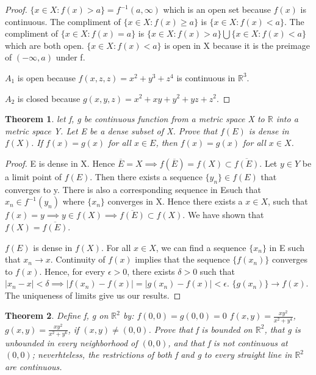 \documentclass{article}
\theoremstyle{plain}
\newtheorem{theorem}{Theorem}
\theoremstyle{definition}
\begin{document}
 \begin{proof}
	 $\{ x \in X: f(x) > a \} = f^{-1}(a,\infty)$ which is an open set because $f(x)$ is continuous. The compliment of $\{ x \in X: f(x) \geq a \}$ is $\{ x \in X: f(x) <  a \}$. The compliment of $\{x \in X: f(x) = a\}$ is $\{ x \in X: f(x) > a \} \bigcup \{x \in X: f(x) < a \}$ which are both open. $\{ x \in X: f(x) < a \}$ is open in X because it is the preimage of $(-\infty, a)$ under f. 
	 

	 $A_{1}$ is open because $f(x,z,z) = x^{2} + y^{3} + z^{4}$ is continuous in $\mathbb{R}^{3}$. 

	 $A_{2}$ is closed because $g(x,y,z) = x^{2} + xy + y^{2} + yz + z^{2}$.
 \end{proof}

 \begin{theorem}
	  
	 let f, g  be continuous function from a metric space X to $\mathbb{R}$ into a metric space Y. Let E be a dense subset of X. Prove that $f(E)$ is dense in $f(X)$. If $f(x) = g(x)$ for all $x \in E$, then $f(x) = g(x)$ for all $x \in X$.
 \end{theorem}

 \begin{proof}
	 E is dense in X. Hence $\overline{E} = X \implies f(\overline{E}) = f(X) \subset \overline{f(E)}$. Let $y \in Y$ be a limit point of $f(E)$. Then there exists a sequence $\{y_{n}\} \in f(E)$ that converges to y. There is also a corresponding sequence in Esuch that $x_{n} \in  f^{-1}(y_{n})$ where $\{x_{n}\}$ converges in X. Hence there exists a $x \in X$, such that $f(x) = y \implies y \in f(X) \implies \overline{f(E)} \subset f(X)$. We have shown that $f(X) = \overline{f(E)}$. 

	 $f(E)$ is dense in $f(X)$. For all $x \in X$, we can find a sequence $\{x_{n}\}$ in E such that $x_{n} \to x$. Continuity of $f(x)$ implies that the sequence $\{f(x_{n})\}$ converges to $f(x)$. Hence, for every $\epsilon > 0$, there exists $\delta > 0$ such that $|x_{n} - x| < \delta \implies |f(x_{n}) - f(x)| = |g(x_{n}) - f(x)| < \epsilon$. $\{ g(x_{n})\} \to f(x)$. The uniqueness of limits give us our results.
 \end{proof}

\begin{theorem}
	Define f, g on $\mathbb{R}^{2}$ by: $f(0,0) = g(0,0) = 0$ $f(x,y) = \frac{xy^{2}}{x^{2} + y^{4}}$, $g(x,y) = \frac{xy^{2}}{x^{2} + y^{6}} $, if $(x,y) \not = (0,0)$. Prove that f is bounded on $\mathbb{R}^{2}$, that g is unbounded in every neighborhood of $(0,0)$, and that f is not continuous at $(0,0)$; neverhteless, the restrictions of both f and g to every straight line in $\mathbb{R}^{2}$ are continuous. 

\end{theorem}
\end{document}
